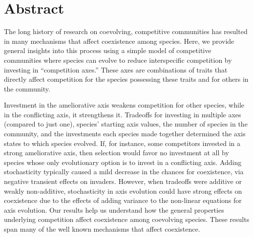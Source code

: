 \section*{Abstract}




The long history of research on coevolving, competitive communities has resulted in 
many mechanisms that affect coexistence among species.
Here, we provide general insights into this process
using a simple model of competitive communities where species can evolve to reduce 
interspecific competition by investing in ``competition axes.''
These axes are combinations of traits that directly affect competition
for the species possessing these traits and for others in the community.


Investment in the ameliorative axis weakens competition for other species, 
while in the conflicting axis, it strengthens it.
Tradeoffs for investing in multiple axes (compared to just one),
species' starting axis values, the number of species in the community,
and the investments each species made
together determined the axis states to which species evolved.
If, for instance, some competitors invested in a strong
ameliorative axis, then selection would favor no investment
at all by species whose only evolutionary option is to invest in
a conflicting axis.
Adding stochasticity typically caused a mild decrease in the chances for
coexistence, via negative transient effects on invaders.
However, when tradeoffs were additive or weakly non-additive,
stochasticity in axis evolution could have strong effects on
coexistence due to the effects of adding variance to the non-linear
equations for axis evolution.
Our results help us understand how the general properties underlying
competition affect coexistence among coevolving species.
These results span many of the well known mechanisms that affect coexistence.




